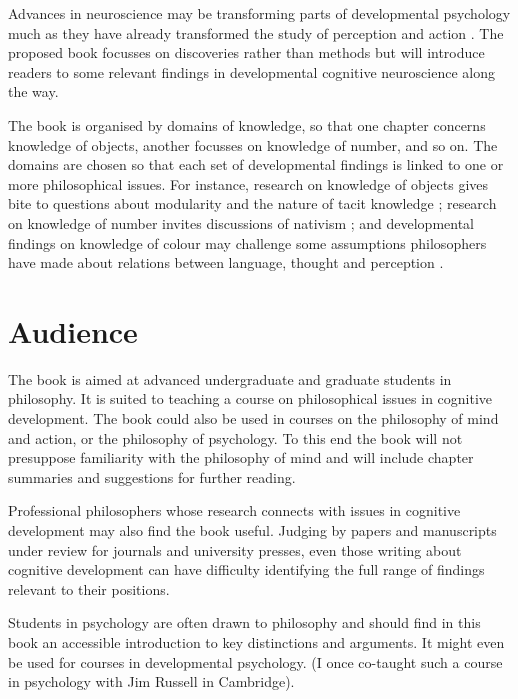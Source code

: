 \documentclass[12pt,\papersize]{extarticle}
\begin{document}
Advances in neuroscience may be transforming parts of developmental psychology much as they have already transformed the study of perception and action \citep{Johnson:2005az}. 
The proposed book focusses on discoveries rather than methods but will introduce readers to some relevant findings in developmental cognitive neuroscience along the way. 

The book is organised by domains of knowledge, so that one chapter concerns knowledge of objects, another focusses on  knowledge of number, and so on.  
The domains are chosen so that each set of developmental findings is linked to one or more philosophical issues. 
For instance, research on knowledge of objects gives bite to questions about modularity and the nature of tacit knowledge \citep{Davies:1989gg,Fodor:1983dg}; research on knowledge of number invites discussions of nativism \citep{Fodor:1981ep,Spelke:1998im}; and developmental findings on knowledge of colour may challenge some assumptions philosophers have made about relations between language, thought and perception \citep{Gilbert:2006yb,Regier:2009ve}.  





\section{Audience}

The book is aimed at advanced undergraduate and graduate students in philosophy. 
It is suited to teaching a course on philosophical issues in cognitive development. 
The book could also be used in courses on the philosophy of mind and action, or the philosophy of psychology. 
To this end the book will not presuppose familiarity with the philosophy of mind and will include chapter summaries and suggestions for further reading.

Professional philosophers whose research connects with issues in cognitive development may also find the book useful.  
Judging by papers and manuscripts under review for journals and university presses, even those writing about cognitive development can have difficulty identifying the full range of findings relevant to their positions.

Students in psychology are often drawn to philosophy and should find in this book an accessible introduction to key distinctions and arguments. 
It might even be used for courses in developmental psychology. (I once co-taught such a course in psychology with Jim Russell in Cambridge).
\end{document}
